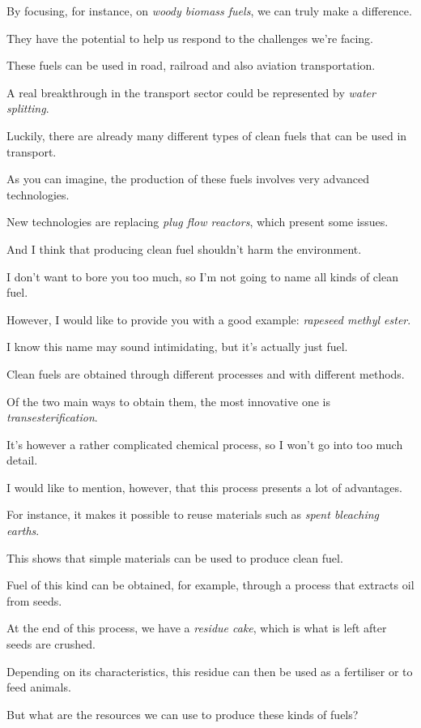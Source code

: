 By focusing, for instance, on \textit{woody biomass fuels}, we can truly make a difference.

They have the potential to help us respond to the challenges we're facing.

\ex These fuels can be used in road, railroad and also aviation transportation.

A real breakthrough in the transport sector could be represented by \textit{water splitting}.

Luckily, there are already many different types of clean fuels that can be used in transport.

\ex As you can imagine, the production of these fuels involves very advanced technologies.

New technologies are replacing \textit{plug flow reactors}, which present some issues.

And I think that producing clean fuel shouldn't harm the environment. 

\ex I don't want to bore you too much, so I'm not going to name all kinds of clean fuel.

However, I would like to provide you with a good example: \textit{rapeseed methyl ester}.

I know this name may sound intimidating, but it's actually just fuel.

\ex Clean fuels are obtained through different processes and with different methods.

Of the two main ways to obtain them, the most innovative one is \textit{transesterification}.

It's however a rather complicated chemical process, so I won't go into too much detail.

\ex I would like to mention, however, that this process presents a lot of advantages.

For instance, it makes it possible to reuse materials such as \textit{spent bleaching earths}.

This shows that simple materials can be used to produce clean fuel.

\ex Fuel of this kind can be obtained, for example, through a process that extracts oil from seeds.

At the end of this process, we have a \textit{residue cake}, which is what is left after seeds are crushed.

Depending on its characteristics, this residue can then be used as a fertiliser or to feed animals.

\ex But what are the resources we can use to produce these kinds of fuels?

